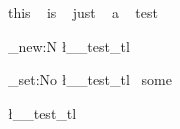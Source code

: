 \documentclass{article}
\begin{document}
 this ~  is ~ just ~ a  ~ test

\tl_new:N \l__test_tl

\tl_set:No \l__test_tl { ~some }

\l__test_tl 

 
 
 
\end{document}
